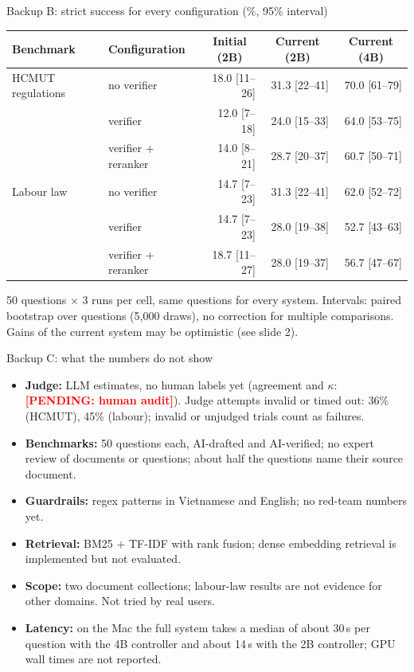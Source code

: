 \documentclass[aspectratio=1610,11pt]{beamer}
\newcommand{\pend}[1]{\textcolor{red}{\textbf{[PENDING: #1]}}}
\newcommand{\cell}[1]{\multicolumn{1}{c}{#1}}
\begin{document}
\begin{frame}{Backup B: strict success for every configuration (\%, 95\% interval)}
  \footnotesize
  \centering
  \begin{tabular}{@{}llrrr@{}}
    \toprule Benchmark & Configuration & \cell{Initial (2B)} & \cell{Current (2B)} & \cell{Current (4B)}\\\midrule
    HCMUT regulations & no verifier & 18.0 [11--26] & 31.3 [22--41] & 70.0 [61--79]\\
    & verifier & 12.0 [7--18] & 24.0 [15--33] & 64.0 [53--75]\\
    & verifier + reranker & 14.0 [8--21] & 28.7 [20--37] & 60.7 [50--71]\\\midrule
    Labour law & no verifier & 14.7 [7--23] & 31.3 [22--41] & 62.0 [52--72]\\
    & verifier & 14.7 [7--23] & 28.0 [19--38] & 52.7 [43--63]\\
    & verifier + reranker & 18.7 [11--27] & 28.0 [19--37] & 56.7 [47--67]\\
    \bottomrule
  \end{tabular}
  \vspace{8pt}

  \raggedright
  50 questions $\times$ 3 runs per cell, same questions for every system. Intervals: paired bootstrap over questions (5,000 draws), no correction for multiple comparisons. Gains of the current system may be optimistic (see slide 2).
\end{frame}

\begin{frame}{Backup C: what the numbers do not show}
  \footnotesize
  \begin{itemize}
    \item \textbf{Judge:} LLM estimates, no human labels yet (agreement and $\kappa$: \pend{human audit}). Judge attempts invalid or timed out: 36\% (HCMUT), 45\% (labour); invalid or unjudged trials count as failures.
    \item \textbf{Benchmarks:} 50 questions each, AI-drafted and AI-verified; no expert review of documents or questions; about half the questions name their source document.
    \item \textbf{Guardrails:} regex patterns in Vietnamese and English; no red-team numbers yet.
    \item \textbf{Retrieval:} BM25 + TF-IDF with rank fusion; dense embedding retrieval is implemented but not evaluated.
    \item \textbf{Scope:} two document collections; labour-law results are not evidence for other domains. Not tried by real users.
    \item \textbf{Latency:} on the Mac the full system takes a median of about 30\,s per question with the 4B controller and about 14\,s with the 2B controller; GPU wall times are not reported.
  \end{itemize}
\end{frame}
\end{document}
